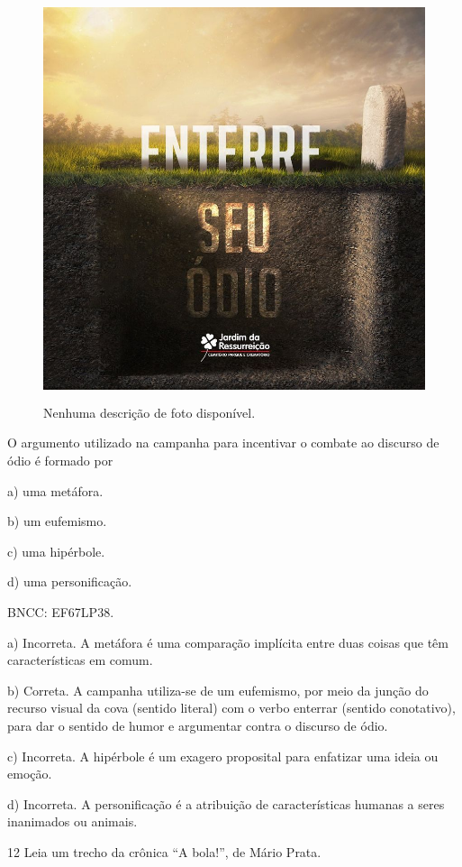 \begin{figure}
\centering
\includegraphics[width=4.65833in,height=4.65833in]{./imgSAEB_6_POR/media/image35.jpeg}
\caption{Nenhuma descrição de foto disponível.}
\end{figure}


O argumento utilizado na campanha para incentivar o combate ao discurso
de ódio é formado por

a) uma metáfora.

b) um eufemismo.

c) uma hipérbole.

d) uma personificação.

BNCC: EF67LP38.

a) Incorreta. A metáfora é uma comparação implícita entre duas coisas
que têm características em comum.

b) Correta. A campanha utiliza-se de um eufemismo, por meio da junção do
recurso visual da cova (sentido literal) com o verbo enterrar (sentido
conotativo), para dar o sentido de humor e argumentar contra o discurso
de ódio.

c) Incorreta. A hipérbole é um exagero proposital para enfatizar uma
ideia ou emoção.

d) Incorreta. A personificação é a atribuição de características humanas
a seres inanimados ou animais.

\num{12} Leia um trecho da crônica ``A bola!'', de Mário Prata.

